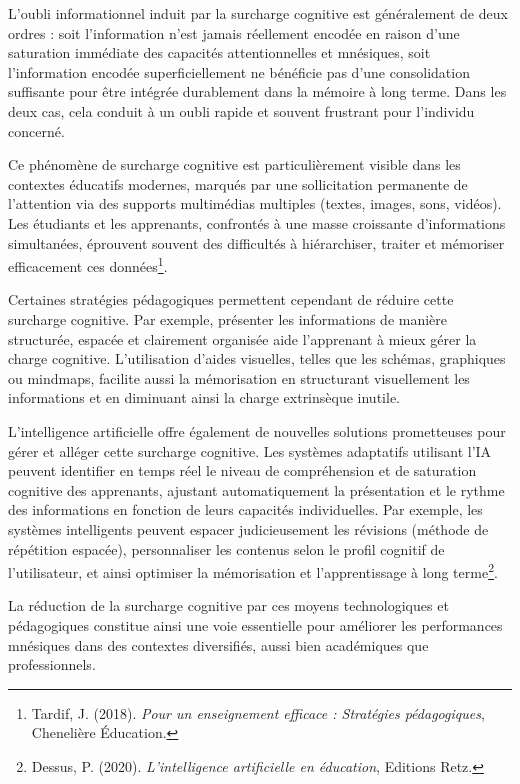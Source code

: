\documentclass[12pt,a4paper]{report}
\begin{document}
L'oubli informationnel induit par la surcharge cognitive est généralement de deux ordres : soit l’information n’est jamais réellement encodée en raison d'une saturation immédiate des capacités attentionnelles et mnésiques, soit l’information encodée superficiellement ne bénéficie pas d'une consolidation suffisante pour être intégrée durablement dans la mémoire à long terme. Dans les deux cas, cela conduit à un oubli rapide et souvent frustrant pour l’individu concerné.

Ce phénomène de surcharge cognitive est particulièrement visible dans les contextes éducatifs modernes, marqués par une sollicitation permanente de l'attention via des supports multimédias multiples (textes, images, sons, vidéos). Les étudiants et les apprenants, confrontés à une masse croissante d’informations simultanées, éprouvent souvent des difficultés à hiérarchiser, traiter et mémoriser efficacement ces données\footnote{Tardif, J. (2018). \textit{Pour un enseignement efficace : Stratégies pédagogiques}, Chenelière Éducation.}.

Certaines stratégies pédagogiques permettent cependant de réduire cette surcharge cognitive. Par exemple, présenter les informations de manière structurée, espacée et clairement organisée aide l’apprenant à mieux gérer la charge cognitive. L'utilisation d’aides visuelles, telles que les schémas, graphiques ou mindmaps, facilite aussi la mémorisation en structurant visuellement les informations et en diminuant ainsi la charge extrinsèque inutile.

L’intelligence artificielle offre également de nouvelles solutions prometteuses pour gérer et alléger cette surcharge cognitive. Les systèmes adaptatifs utilisant l'IA peuvent identifier en temps réel le niveau de compréhension et de saturation cognitive des apprenants, ajustant automatiquement la présentation et le rythme des informations en fonction de leurs capacités individuelles. Par exemple, les systèmes intelligents peuvent espacer judicieusement les révisions (méthode de répétition espacée), personnaliser les contenus selon le profil cognitif de l’utilisateur, et ainsi optimiser la mémorisation et l'apprentissage à long terme\footnote{Dessus, P. (2020). \textit{L'intelligence artificielle en éducation}, Editions Retz.}.

La réduction de la surcharge cognitive par ces moyens technologiques et pédagogiques constitue ainsi une voie essentielle pour améliorer les performances mnésiques dans des contextes diversifiés, aussi bien académiques que professionnels.
\end{document}
